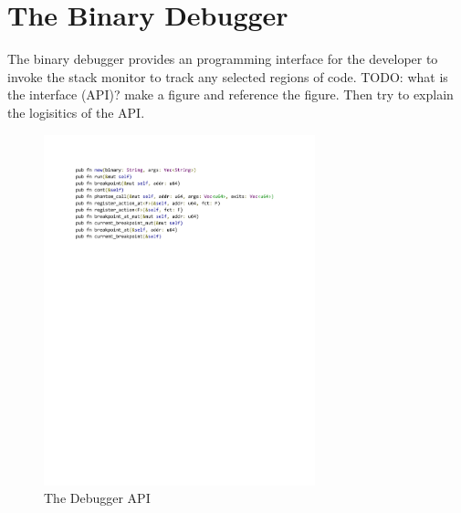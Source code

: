 \documentclass{article} \usepackage{graphicx}
\begin{document}

\section{The Binary Debugger}

The binary debugger provides an programming interface for the developer to
invoke the stack monitor to track any selected regions of code.  TODO: what is
the interface (API)? make a figure and reference the figure. Then try to explain
the logisitics of the API.

\begin{figure} \begin{center}
\includegraphics[height=4in]{api.pdf} \end{center}
\caption{The Debugger API}
\label{fig-workflow} \end{figure}
\end{document}
